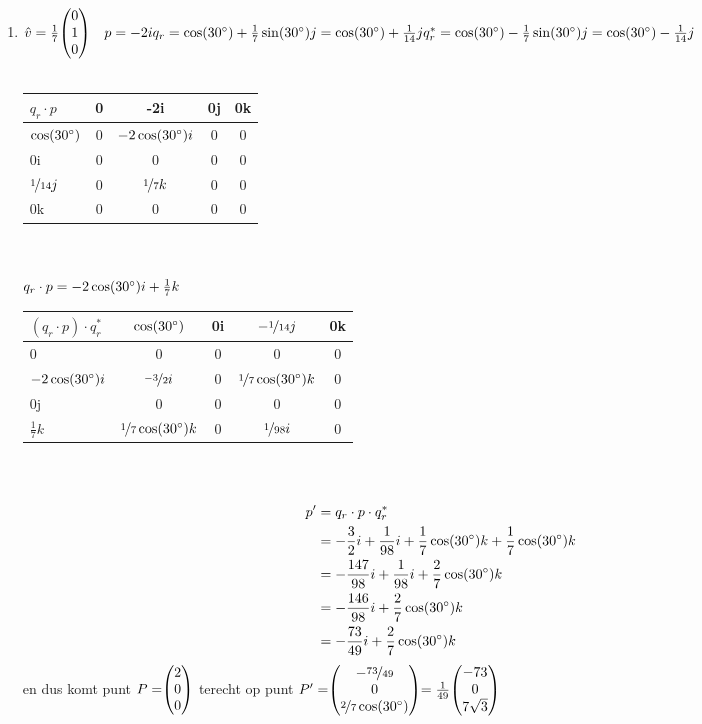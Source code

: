 \begin{enumerate}
	\item 
	$\hat{v} = \frac{1}{7}\vecdrie{0}{1}{0}
	\quad p  = -2i   \\
	q_r    =  \cos(30 \degree)  + \frac{1}{7}\sin(30 \degree) j  =  \cos(30 \degree) + \frac{1}{14}j \\
	q^*_r  =  \cos(30 \degree)  - \frac{1}{7}\sin(30 \degree) j  =  \cos(30 \degree) - \frac{1}{14}j $ \\ \\
	\begin{tabular}{ | l || c | c |c |c |}
		\hline
		$ q_r\cdot p $ & 0 & -2i  & 0j       & 0k \\ \hline \hline
		$\cos(30 \degree) $   & 0 & $ -2\cos(30 \degree) i  $ &   0    & 0  \\ \hline
		0i         & 0 & 0   &   0    & 0 \\ \hline
		$\nicefrac{1}{14}j$         & 0 &  $\nicefrac{1}{7}k$  &   0     & 0\\ \hline
		0k         & 0  & 0 & 0      & 0 \\ 
		\hline 
	\end{tabular} \\ \\
	$ q_r\cdot p = -2\cos(30 \degree) i + \frac{1}{7}k$\\
	
	\begin{tabular}{ | l || c | c |c |c |}
		\hline
		$ (q_r\cdot p)\cdot q^*_r $ & $\cos(30 \degree)$  & 0i  & $-\nicefrac{1}{14}j$   & 0k \\ \hline \hline
		0  & 0 & 0 &   0    & 0  \\ \hline
		$ -2\cos(30 \degree)i  $   & $ \nicefrac{-3}{2} i  $ & 0 &   $ \nicefrac{1}{7}\cos(30 	\degree)k $    & 0 \\ \hline
		0j         & 0 &  0  &   0     & 0\\ \hline
		$\frac{1}{7}k$         &  $ \nicefrac{1}{7}\cos(30 	\degree) k $     & 0 & $\nicefrac{1}{98}i$      & 0 \\ 
		\hline 
	\end{tabular} \\ \\
    \begin{align*}
        p' &= q_r\cdot p\cdot q^*_r  \\
           &= -\frac{3}{2}i + \frac{1}{98}i + \frac{1}{7}\cos(30 \degree)  k+ \frac{1}{7}\cos(30 \degree)  k \\
           &= -\frac{147}{98}i + \frac{1}{98}i  + \frac{2}{7}\cos(30 \degree)  k \\
           &= -\frac{146}{98}i + \frac{2}{7}\cos(30 \degree)  k \\
           &= -\frac{73}{49}i + \frac{2}{7}\cos(30 \degree)  k 
    \end{align*}
	en dus komt  punt $ P= \vecdrie{2}{0}{0} $  terecht op punt $ P'= \vecdrie{-\nicefrac{73}{49}}{0}{\nicefrac{2}{7}\cos(30 \degree)} = \frac{1}{49}\vecdrie{-73}{0}{7\sqrt{3}}$ 
	
\end{enumerate}

